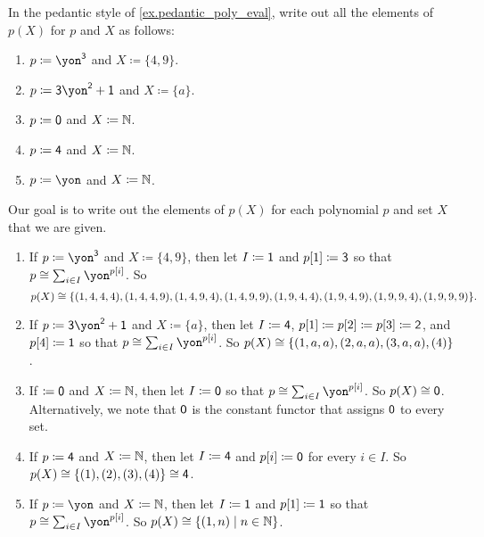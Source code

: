 \documentclass[Book-Poly]{subfiles}
\begin{document}
\begin{exercise}
In the pedantic style of \cref{ex.pedantic_poly_eval}, write out all the elements of $p(X)$ for $p$ and $X$ as follows:
\begin{enumerate}
	\item $p\coloneqq\yon^\3$ and $X\coloneqq\{4,9\}.$
	\item $p\coloneqq\3\yon^\2+\1$ and $X\coloneqq\{a\}$.
	\item $p\coloneqq\textsf{0}$ and $X\coloneqq\mathbb{N}$.
	\item $p\coloneqq\textsf{4}$ and $X\coloneqq\mathbb{N}$.
	\item $p\coloneqq\yon$ and $X\coloneqq\mathbb{N}$.
\qedhere
\end{enumerate}

\begin{solution}
Our goal is to write out the elements of $p(X)$ for each polynomial $p$ and set $X$ that we are given.
\begin{enumerate}
    \item If $p\coloneqq\yon^\3$ and $X\coloneqq\{4,9\}$, then let $I \coloneqq \textsf{1}$ and $p[1] \coloneqq \textsf{3}$ so that $p \iso \sum_{i \in I} \yon^{p[i]}$.
    So
    \[
        p(X) \cong \{(1, 4, 4, 4), (1, 4, 4, 9), (1, 4, 9, 4), (1, 4, 9, 9), (1, 9, 4, 4), (1, 9, 4, 9), (1, 9, 9, 4), (1, 9, 9, 9)\}.
    \]
    
    \item If $p\coloneqq\3\yon^\2+\1$ and $X\coloneqq\{a\}$, then let $I \coloneqq \textsf{4}$, $p[1] \coloneqq p[2] \coloneqq p[3] \coloneqq \textsf{2}$, and $p[4] \coloneqq \textsf{1}$ so that $p \iso \sum_{i \in I} \yon^{p[i]}$.
    So $p(X) \cong \{(1, a, a), (2, a, a), (3, a, a), (4)\}$.
	
	\item If $\coloneqq\textsf{0}$ and $X\coloneqq\mathbb{N}$, then let $I \coloneqq \textsf{0}$ so that $p \iso \sum_{i \in I} \yon^{p[i]}$.
	So $p(X) \cong \textsf{0}$.
	Alternatively, we note that $\textsf{0}$ is the constant functor that assigns $\textsf{0}$ to every set. 
	
	\item If $p\coloneqq\textsf{4}$ and $X\coloneqq\mathbb{N}$, then let $I \coloneqq \textsf{4}$ and $p[i] \coloneqq \textsf{0}$ for every $i \in I$.
	So $p(X) \cong \{(1), (2), (3), (4)\} \cong \textsf{4}$.
	
	\item If $p\coloneqq\yon$ and $X\coloneqq\mathbb{N}$, then let $I \coloneqq \textsf{1}$ and $p[1] \coloneqq \textsf{1}$ so that $p \iso \sum_{i \in I} \yon^{p[i]}$.
    So $p(X) \cong \{(1, n) \mid n \in \mathbb{N}\}$.
\end{enumerate}
\end{solution}
\end{exercise}
\end{document}
